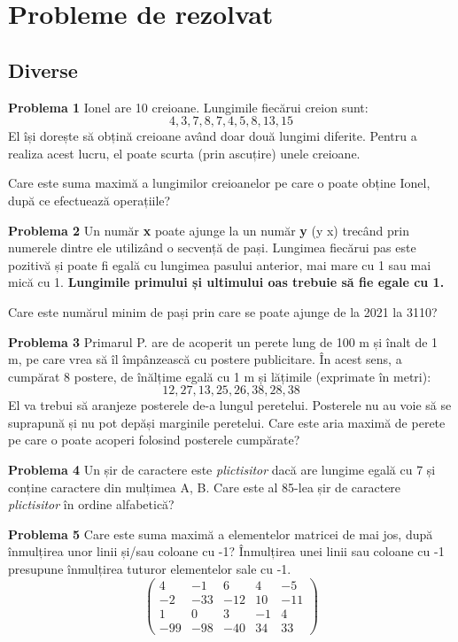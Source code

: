 \documentclass[11pt, a4paper]{article}
\begin{document}
\newpage

\section{Probleme de rezolvat}
\subsection{Diverse}
\textbf{Problema 1}\newline
Ionel are 10 creioane. Lungimile fiecărui creion sunt: \[ 4, 3, 7, 8, 7, 4, 5, 8, 13, 15\]
El își dorește să obțină creioane având doar două lungimi diferite. Pentru a realiza acest lucru, el poate scurta (prin ascuțire) unele creioane.

\noindent Care este suma maximă a lungimilor creioanelor pe care o poate obține Ionel, după ce efectuează operațiile?
\vspace{1cm}

\textbf{Problema 2}\newline
Un număr \textbf{x} poate ajunge la un număr \textbf{y} (y \> x) trecând prin numerele dintre ele utilizând o secvență de pași. Lungimea fiecărui pas este pozitivă și poate fi egală cu lungimea pasului anterior, mai mare cu 1 sau mai mică cu 1. \textbf{Lungimile primului și ultimului oas trebuie să fie egale cu 1.}

\noindent Care este numărul minim de pași prin care se poate ajunge de la 2021 la 3110?
\vspace{1cm}

\textbf{Problema 3}\newline
Primarul P. are de acoperit un perete lung de 100 m și înalt de 1 m, pe care vrea să îl împânzească cu postere publicitare. În acest sens, a cumpărat 8 postere, de înălțime egală cu 1 m și lățimile (exprimate în metri):
\[ 12, 27, 13, 25, 26, 38, 28, 38 \]
El va trebui să aranjeze posterele de-a lungul peretelui. Posterele nu au voie să se suprapună și nu pot depăși marginile peretelui. Care este aria maximă de perete pe care o poate acoperi folosind posterele cumpărate?
\vspace{1cm}

\textbf{Problema 4}\newline
Un șir de caractere este \textit{plictisitor} dacă are lungime egală cu 7 și conține caractere din mulțimea {A, B}. Care este al 85-lea șir de caractere \textit{plictisitor} în ordine alfabetică?
\vspace{1cm}

\textbf{Problema 5}\newline
Care este suma maximă a elementelor matricei de mai jos, după înmulțirea unor linii și/sau coloane cu -1? Înmulțirea unei linii sau coloane cu -1 presupune înmulțirea tuturor elementelor sale cu -1.
\[
  \begin{pmatrix}
    4 & -1 & 6 & 4 & -5 \\
    -2 & -33 & -12 & 10 & -11 \\
    1 & 0 & 3 & -1 & 4 \\
    -99 & -98 & -40 & 34 & 33
  \end{pmatrix}
\]
\newpage
\end{document}
